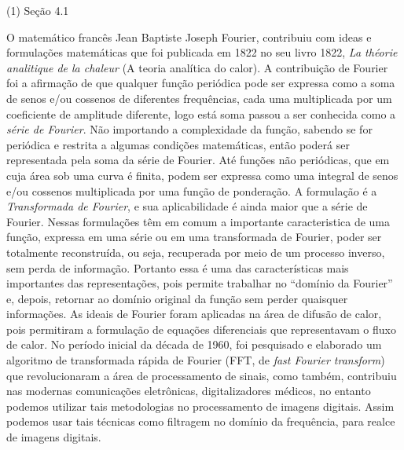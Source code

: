 \documentclass[12pt,a4paper]{article}
\begin{document}
\begin{solution}
    \begin{tasks}(1)
        \task Seção 4.1 

            O matemático francês Jean Baptiste Joseph Fourier, contribuiu com
            ideas e formulações matemáticas que foi publicada em 1822 no seu
            livro 1822, \textit{La théorie analitique de la chaleur} (A teoria
            analítica do calor). A contribuição de Fourier foi a afirmação de
            que qualquer função periódica pode ser expressa como a soma de senos
            e/ou cossenos de diferentes frequências, cada uma multiplicada por
            um coeficiente de amplitude diferente, logo está soma passou a ser
            conhecida como a \textit{série de Fourier}. Não importando a
            complexidade da função, sabendo se for periódica e restrita a
            algumas condições matemáticas, então poderá ser representada pela
            soma da série de Fourier. Até funções não periódicas, que em cuja
            área sob uma curva é finita, podem ser expressa como uma integral de
            senos e/ou cossenos multiplicada por uma função de ponderação. A
            formulação é a \textit{Transformada de Fourier}, e sua
            aplicabilidade é ainda maior que a série de Fourier. Nessas
            formulações têm em comum a importante caracteristica de uma função,
            expressa em uma série ou em uma transformada de Fourier, poder ser
            totalmente reconstruída, ou seja, recuperada por meio de um processo
            inverso, sem perda de informação. Portanto essa é uma das
            características mais importantes das representações, pois permite
            trabalhar no ``domínio da Fourier'' e, depois, retornar ao domínio
            original da função sem perder quaisquer informações. As ideais de
            Fourier foram aplicadas na área de difusão de calor, pois permitiram
            a formulação de equações diferenciais que representavam o fluxo de
            calor. No período inicial da década de 1960, foi pesquisado e
            elaborado um algoritmo de transformada rápida de Fourier (FFT, de
            \textit{fast Fourier transform}) que revolucionaram a área de
            processamento de sinais, como também, contribuiu nas modernas
            comunicações eletrônicas, digitalizadores médicos, no entanto
            podemos utilizar tais metodologias no processamento de imagens
            digitais. Assim podemos usar tais técnicas como filtragem no domínio
            da frequência, para realce de imagens digitais.


\end{tasks}
\end{solution}
\end{document}
